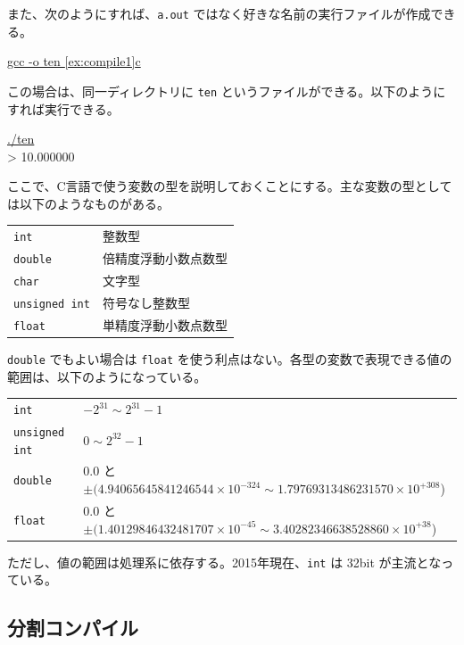 また、次のようにすれば、\verb+a.out+ ではなく好きな名前の実行ファイルが作成できる。
\begin{commandline2}
\prompt \underline{gcc -o ten \ref{ex:compile1}c}
\end{commandline2} \noindent
この場合は、同一ディレクトリに \verb+ten+ というファイルができる。以下のようにすれば実行できる。
\begin{commandline2}
\prompt \underline{./ten} \\
> 10.000000
\end{commandline2}

ここで、C言語で使う変数の型を説明しておくことにする。主な変数の型としては以下のようなものがある。
\begin{table}[H]
\begin{center}
\begin{tabular}{ll}
  \verb+int+           &整数型 \\
  \verb+double+        &倍精度浮動小数点数型 \\
  \verb+char+          &文字型 \\
  \verb+unsigned int+  &符号なし整数型 \\
  \verb+float+         &単精度浮動小数点数型
\end{tabular}
\end{center}
\end{table} \noindent
\verb+double+ でもよい場合は \verb+float+ を使う利点はない。各型の変数で表現できる値の範囲は、以下のようになっている。
\begin{table}[H]
\begin{center}
\begin{tabular}{ll}
  \verb+int+          & $-2^{31}\sim 2^{31}-1$ \\
  \verb+unsigned int+ & $0\sim 2^{32}-1$ \\
  \verb+double+       & {\small 0.0 と $\pm(4.94065645841246544\times10^{-324}\sim 1.79769313486231570\times10^{+308}$)} \\
  \verb+float+        & {\small 0.0 と $\pm(1.40129846432481707\times10^{-45}\sim 3.40282346638528860\times10^{+38}$)}
\end{tabular}
\end{center}
\end{table} \noindent
ただし、値の範囲は処理系に依存する。2015年現在、\verb+int+ は 32bit が主流となっている。

\subsection {分割コンパイル}


